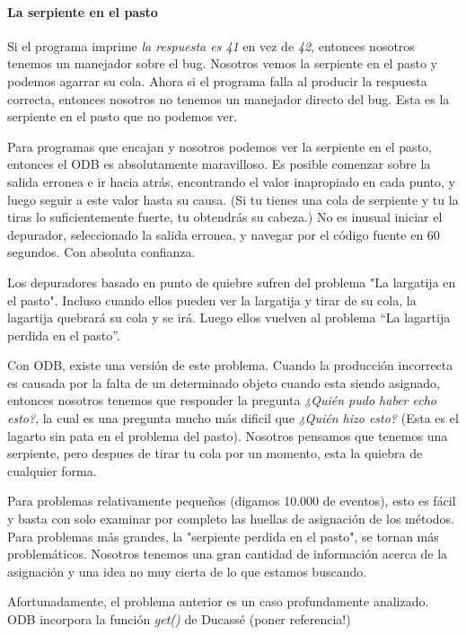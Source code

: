 \documentclass[12pt,legalpaper]{report}
\begin{document}
				\paragraph{La serpiente en el pasto}

Si el programa imprime \textit{la respuesta es 41} en vez de \textit{42}, entonces nosotros tenemos un manejador sobre el bug.  Nosotros vemos la serpiente en el pasto y podemos agarrar su cola.  Ahora si el programa falla al producir la respuesta correcta, entonces nosotros no tenemos un manejador directo del bug.  Esta es la serpiente en el pasto que no podemos ver.

Para programas que encajan y nosotros podemos ver la serpiente en el pasto, entonces el ODB es absolutamente maravilloso.  Es posible comenzar sobre la salida erronea e ir hacia atrás, encontrando el valor inapropiado en cada punto, y luego seguir a este valor hasta su causa. (Si tu tienes una cola de serpiente y tu la tiras lo suficientemente fuerte, tu obtendrás su cabeza.)  No es inusual iniciar el depurador, seleccionado la salida erronea, y navegar por el código fuente en 60 segundos. Con absoluta confianza.

Los depuradores basado en punto de quiebre sufren del problema "La largatija en el pasto".  Incluso cuando ellos pueden ver la largatija y tirar de su cola, la lagartija quebrará su cola y se irá.  Luego ellos vuelven al problema “La lagartija perdida en el pasto”.

Con ODB, existe una versión de este problema.  Cuando la producción incorrecta es causada por la falta de un determinado objeto cuando esta siendo asignado, entonces nosotros tenemos que responder la pregunta \textit{¿Quién pudo haber echo esto?}, la cual es una pregunta mucho más dificil que \textit{¿Quién hizo esto?} (Esta es el lagarto sin pata en el problema del pasto).  Nosotros pensamos que tenemos una serpiente, pero despues de tirar tu cola por un momento, esta la quiebra de cualquier forma.

Para problemas relativamente pequeños (digamos 10.000 de eventos), esto es fácil y basta con solo examinar por completo las huellas de asignación de los métodos.  Para problemas más grandes, la "serpiente perdida en el pasto", se tornan más problemáticos.  Nosotros tenemos una gran cantidad de información acerca de la asignación y una idea no muy cierta de lo que estamos buscando.

Afortunadamente, el problema anterior es un caso profundamente analizado.  ODB incorpora la función \textit{get()} de Ducassé (poner referencia!)
\end{document}
